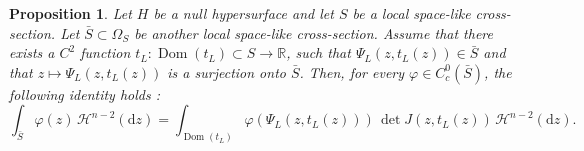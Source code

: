 \documentclass[12pt,a4paper]{amsart}
\theoremstyle{plain}
\newtheorem{proposition}[lemma]{Proposition}
\theoremstyle{definition}
\numberwithin{equation}{section}
\let\phi\varphi
\newcommand{\R}{\mathbb{R}}
\DeclareMathOperator{\Dom}{Dom}
\newcommand{\de}{{\mathrm{d}}}
\newcommand{\haus}{\mathcal{H}}
\newcommand{\gflow}{\Psi}
\begin{document}
\begin{proposition}
  \label{P:graph-surface}
  Let $H$ be a null hypersurface and let $S$ be a local space-like
  cross-section.
  Let $\bar S\subset \Omega_S$ be another local space-like
  cross-section.
  Assume that there exists a $C^2$ function $t_L:\Dom(t_L)\subset S \to\R$,
  such that $\gflow_L(z,t_L(z))\in \bar S$ and that $z\mapsto
  \gflow_L(z,t_L(z))$ is a surjection onto $\bar{S}$. Then, for every $\varphi\in C^0_c(\bar{S})$, the following identity holds :
  \begin{equation}
    \label{eq:graph-surface}
    \int_{\bar S}
    \phi(z)
    \,
    \haus^{n-2}(\de z)
    =
    \int_{\Dom(t_L)}
    \phi(\gflow_L(z,t_L(z)))
    \,
\det J (z,t_L(z))
    \,
    \haus^{n-2}(\de z)
    .
  \end{equation}
\end{proposition}
\end{document}
